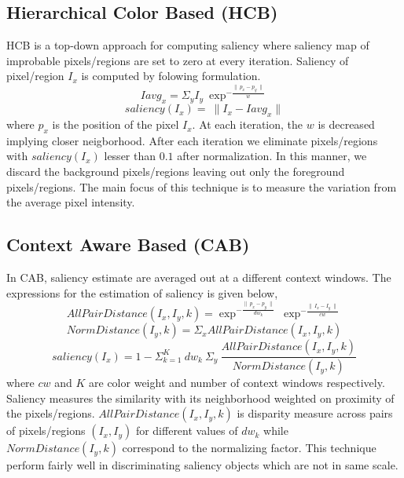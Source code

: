 \subsection{Hierarchical Color Based (HCB)}
HCB is a top-down approach for computing saliency where saliency map of improbable pixels/regions are set to zero at every iteration. Saliency of pixel/region $I_{x}$ is computed by folowing formulation. 
$$ Iavg_{x} = \Sigma_{y} I_{y}~\exp^{-\frac{\parallel~p_{x} - p_{y}~\parallel}{w}}  $$
$$ saliency(I_{x}) =~\parallel I_{x} - Iavg_{x} \parallel $$
where $p_{x}$ is the position of the pixel $I_{x}$. At each iteration, the $w$ is decreased implying closer neigborhood. After each iteration we eliminate pixels/regions with $ saliency(I_{x})$ lesser than $0.1$ after normalization. In this manner, we  discard the background pixels/regions leaving out only the foreground pixels/regions. The main focus of this technique is to measure the variation from the average pixel intensity.

\subsection{Context Aware Based (CAB)}
In CAB, saliency estimate are averaged out at a different context windows. The expressions for the estimation of saliency is given below,
$$ AllPairDistance(I_{x},I_{y},k) = \exp^{-\frac{\parallel~p_x - p_y~\parallel}{dw_k}}~\exp^{-\frac{\parallel~I_{x} - I_{y}~\parallel}{cw}}$$
$$ NormDistance(I_{y},k) = \Sigma_{x} AllPairDistance(I_{x},I_{y},k)$$
$$ saliency(I_{x}) = 1- \Sigma^{K}_{k=1}~dw_{k}~\Sigma_{y}~\frac{AllPairDistance(I_{x},I_{y},k)}{NormDistance(I_{y},k)}$$
where $cw$ and $K$ are color weight and number of context windows respectively. Saliency measures the similarity with its neighborhood weighted on proximity of the pixels/regions. $AllPairDistance(I_{x},I_{y},k)$ is disparity measure across pairs of pixels/regions $(I_{x},I_{y})$ for different values of $dw_{k}$ while $NormDistance(I_{y},k)$ correspond to the normalizing factor.
This technique perform fairly well in discriminating saliency objects which are not in same scale.

